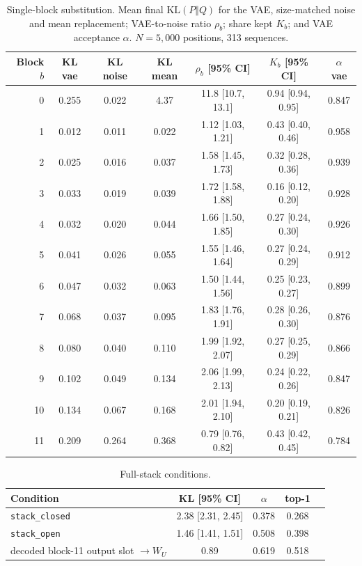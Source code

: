 \documentclass[11pt]{article}
\newcommand{\KL}{\mathrm{KL}}
\begin{document}
\begin{table}[h]
\centering
\small
\begin{tabular}{rcccccc}
\toprule
Block $b$ & KL vae & KL noise & KL mean & $\rho_b$ [95\% CI] & $K_b$ [95\% CI] & $\alpha$ vae \\
\midrule
0  & 0.255 & 0.022 & 4.37  & 11.8 [10.7, 13.1] & 0.94 [0.94, 0.95] & 0.847 \\
1  & 0.012 & 0.011 & 0.022 & 1.12 [1.03, 1.21] & 0.43 [0.40, 0.46] & 0.958 \\
2  & 0.025 & 0.016 & 0.037 & 1.58 [1.45, 1.73] & 0.32 [0.28, 0.36] & 0.939 \\
3  & 0.033 & 0.019 & 0.039 & 1.72 [1.58, 1.88] & 0.16 [0.12, 0.20] & 0.928 \\
4  & 0.032 & 0.020 & 0.044 & 1.66 [1.50, 1.85] & 0.27 [0.24, 0.30] & 0.926 \\
5  & 0.041 & 0.026 & 0.055 & 1.55 [1.46, 1.64] & 0.27 [0.24, 0.29] & 0.912 \\
6  & 0.047 & 0.032 & 0.063 & 1.50 [1.44, 1.56] & 0.25 [0.23, 0.27] & 0.899 \\
7  & 0.068 & 0.037 & 0.095 & 1.83 [1.76, 1.91] & 0.28 [0.26, 0.30] & 0.876 \\
8  & 0.080 & 0.040 & 0.110 & 1.99 [1.92, 2.07] & 0.27 [0.25, 0.29] & 0.866 \\
9  & 0.102 & 0.049 & 0.134 & 2.06 [1.99, 2.13] & 0.24 [0.22, 0.26] & 0.847 \\
10 & 0.134 & 0.067 & 0.168 & 2.01 [1.94, 2.10] & 0.20 [0.19, 0.21] & 0.826 \\
11 & 0.209 & 0.264 & 0.368 & 0.79 [0.76, 0.82] & 0.43 [0.42, 0.45] & 0.784 \\
\bottomrule
\end{tabular}
\caption{Single-block substitution. Mean final $\KL(P\Vert Q)$ for the VAE, size-matched noise and mean replacement;
VAE-to-noise ratio $\rho_b$; share kept $K_b$; and VAE acceptance $\alpha$. $N = 5{,}000$ positions, 313 sequences.}
\label{tab:single}
\end{table}

\begin{table}[h]
\centering
\small
\begin{tabular}{lcccc}
\toprule
Condition & KL [95\% CI] & $\alpha$ & top-1 \\
\midrule
\texttt{stack\_closed} & 2.38 [2.31, 2.45] & 0.378 & 0.268 \\
\texttt{stack\_open}   & 1.46 [1.41, 1.51] & 0.508 & 0.398 \\
decoded block-11 output slot $\to W_U$ & 0.89 & 0.619 & 0.518 \\
\bottomrule
\end{tabular}
\caption{Full-stack conditions.}
\label{tab:stack}
\end{table}
\end{document}
